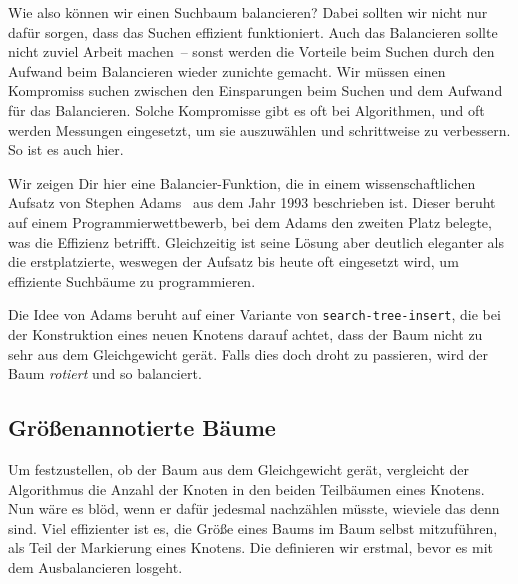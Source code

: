 Wie also können wir einen Suchbaum balancieren? Dabei sollten wir
nicht nur dafür sorgen, dass das Suchen effizient funktioniert.  Auch
das Balancieren sollte nicht zuviel Arbeit machen~-- sonst werden die
Vorteile beim Suchen durch den Aufwand beim Balancieren wieder
zunichte gemacht.  Wir müssen einen
Kompromiss suchen zwischen den Einsparungen beim Suchen und dem
Aufwand für das Balancieren.  Solche Kompromisse gibt es oft bei
Algorithmen, und oft werden Messungen eingesetzt, um sie auszuwählen
und schrittweise zu verbessern.  So ist es auch hier.

Wir zeigen Dir hier eine Balancier-Funktion, die in einem
wissenschaftlichen Aufsatz von Stephen Adams~\cite{Adams1993} aus dem
Jahr 1993 beschrieben ist.  Dieser beruht auf einem
Programmierwettbewerb, bei dem Adams den zweiten Platz belegte, was
die Effizienz betrifft.  Gleichzeitig ist seine Lösung aber deutlich
eleganter als die erstplatzierte, weswegen der Aufsatz bis heute oft
eingesetzt wird, um effiziente Suchbäume zu programmieren.

Die Idee von Adams beruht auf einer Variante von
\lstinline{search-tree-insert}, die bei der Konstruktion eines neuen
Knotens darauf achtet, dass der Baum nicht zu sehr aus dem
Gleichgewicht gerät.  Falls dies doch droht zu passieren, wird der
Baum \textit{rotiert} und so balanciert.

\subsection{Größenannotierte Bäume}

Um festzustellen, ob der Baum aus dem Gleichgewicht gerät, vergleicht
der Algorithmus die Anzahl der Knoten in den beiden Teilbäumen eines
Knotens.  Nun wäre es blöd, wenn er dafür jedesmal nachzählen müsste,
wieviele das denn sind.  Viel effizienter ist es, die Größe eines
Baums im Baum selbst mitzuführen, als Teil der Markierung eines
Knotens.  Die definieren wir erstmal, bevor es mit dem Ausbalancieren
losgeht.

